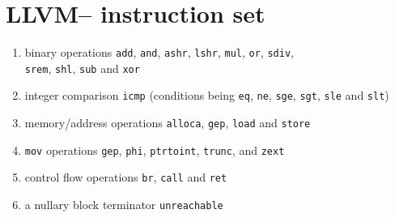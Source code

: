 \documentclass{article}
\begin{document}
\printbibliography 


\appendix

\newpage


\section{LLVM-- instruction set}
\label{appendix:llvmis}
\begin{enumerate}
    \item binary operations \lstinline!add!, \lstinline!and!, \lstinline!ashr!, \lstinline!lshr!, \lstinline!mul!, \lstinline!or!, \lstinline!sdiv!,\\\lstinline!srem!, \lstinline!shl!, \lstinline!sub! and \lstinline!xor!
    \item integer comparison \lstinline!icmp! (conditions being \lstinline!eq!, \lstinline!ne!, \lstinline!sge!, \lstinline!sgt!, \lstinline!sle! and \lstinline!slt!)
    \item memory/address operations \lstinline!alloca!, \lstinline!gep!, \lstinline!load! and \lstinline!store!
    \item  \lstinline!mov! operations \lstinline!gep!, \lstinline!phi!, \lstinline!ptrtoint!, \lstinline!trunc!, and \lstinline!zext!
    \item control flow operations \lstinline!br!, \lstinline!call! and \lstinline!ret!
    \item a  nullary block terminator \lstinline!unreachable!
\end{enumerate}
\end{document}
